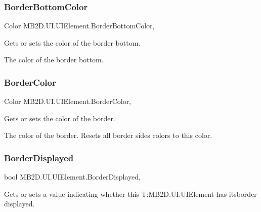\subsubsection{\texorpdfstring{Border\+Bottom\+Color}{BorderBottomColor}}
{\footnotesize\ttfamily Color M\+B2\+D.\+U\+I.\+U\+I\+Element.\+Border\+Bottom\+Color\hspace{0.3cm}{\ttfamily [get]}, {\ttfamily [set]}}



Gets or sets the color of the border bottom. 

The color of the border bottom.\hypertarget{class_m_b2_d_1_1_u_i_1_1_u_i_element_a7e243b6b0b62b303751ce9d0425fbf1f}{}\label{class_m_b2_d_1_1_u_i_1_1_u_i_element_a7e243b6b0b62b303751ce9d0425fbf1f} 
\subsubsection{\texorpdfstring{Border\+Color}{BorderColor}}
{\footnotesize\ttfamily Color M\+B2\+D.\+U\+I.\+U\+I\+Element.\+Border\+Color\hspace{0.3cm}{\ttfamily [get]}, {\ttfamily [set]}}



Gets or sets the color of the border. 

The color of the border. Resets all border sides\textquotesingle{} colors to this color.\hypertarget{class_m_b2_d_1_1_u_i_1_1_u_i_element_a27fdfa5d734c96e8249bb7955d2d069c}{}\label{class_m_b2_d_1_1_u_i_1_1_u_i_element_a27fdfa5d734c96e8249bb7955d2d069c} 
\subsubsection{\texorpdfstring{Border\+Displayed}{BorderDisplayed}}
{\footnotesize\ttfamily bool M\+B2\+D.\+U\+I.\+U\+I\+Element.\+Border\+Displayed\hspace{0.3cm}{\ttfamily [get]}, {\ttfamily [set]}}



Gets or sets a value indicating whether this T\+:\+M\+B2\+D.\+U\+I.\+U\+I\+Element has itsborder displayed. 

